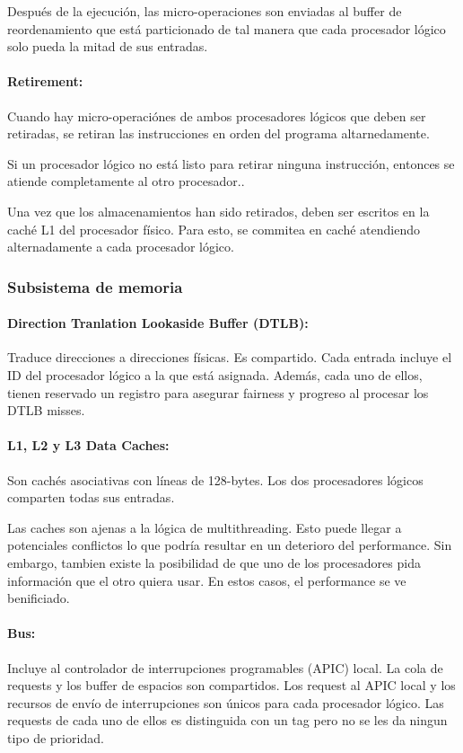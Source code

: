 Después de la ejecución, las micro-operaciones son enviadas al buffer de reordenamiento que está particionado de tal manera que cada procesador lógico solo pueda la mitad de sus entradas.

\paragraph{Retirement:} Cuando hay micro-operaciónes de ambos procesadores lógicos que deben ser retiradas, se  retiran las instrucciones en orden del programa altarnedamente.

Si un procesador lógico no está listo para retirar ninguna instrucción, entonces se atiende completamente al otro procesador..

Una vez que los almacenamientos han sido retirados, deben ser escritos en la caché L1 del procesador físico. Para esto, se commitea en caché atendiendo alternadamente a cada procesador lógico.

\subsubsection{Subsistema de memoria}

\paragraph{Direction Tranlation Lookaside Buffer (DTLB):} Traduce direcciones a direcciones físicas. Es compartido. Cada entrada incluye el ID del procesador lógico a la que está asignada. Además, cada uno de ellos, tienen reservado un registro para asegurar fairness y progreso al procesar los DTLB misses.

\paragraph{L1, L2 y L3 Data Caches:}
Son cachés asociativas con líneas de 128-bytes. Los dos procesadores lógicos comparten todas sus entradas.

Las caches son ajenas a la lógica de multithreading. Esto puede llegar a potenciales conflictos lo que podría resultar en un deterioro del performance. Sin embargo, tambien existe la posibilidad de que uno de los procesadores pida información que el otro quiera usar. En estos casos, el performance se ve benificiado.

\paragraph{Bus:} Incluye al controlador de interrupciones programables (APIC) local.
La cola de requests y los buffer de espacios son compartidos. Los request al APIC local y los recursos de envío de interrupciones son únicos para cada procesador lógico. Las requests de cada uno de ellos es distinguida con un tag pero no se les da ningun tipo de prioridad.

